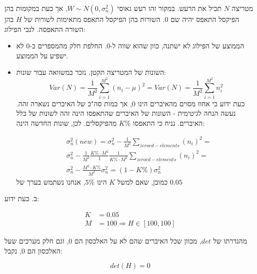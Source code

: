 \documentclass[a4paper]{iacas}
\begin{document}
\begin{hebrew}
מטריצה $N$ תכיל את הרעש. במקור זהו רעש גאוסי $W \sim N(0,\sigma_n^2)$, אך כעת במקומות בהן הפיקסל התאפס יהיה שם 0. השורות בהן הפיקסל התאפס מתאימות לשורות של $H$ בהן השורה התאפסה. לגבי הפילוג:
\begin{itemize}
\item הממוצע של הפילוג לא ישתנה, כוון שהוא שווה ל-$0$. החלפת חלק מהמספרים ב-$0$ לא ישפיע על הממוצע.
\item השונות של המטריצה תקטן. נזכר במשוואה עבור שונות:
\begin{equation*}
Var(N) = \frac{1}{M^2}\sum_{i=1}^{M^2}{(n_i - \mu)^2} = Var(N) = \frac{1}{M^2}\sum_{i=1}^{M^2}{n_i^2} 
\end{equation*}
כעת ידוע כי אחוז מסוים מהאיברים הינו $0$, אך כמות סה"כ של האיברים נשארה זהה. נעשה הנחה לגיטימית - השונות של האיברים שהתאפסו הינה זהה לשונות של כלל האיברים. נניח כי התאפסו $K\%$ מהפיקסלים. לכן, שונות החדשה הינה:

\begin{equation*}
\begin{aligned}
&\sigma_n^2 (new) = \sigma_n^2 -  \frac{1}{M^2}\sum_{zeroed-elements}{(n_i)^2} =\\
&\sigma_n^2 -  \frac{1}{M^2}\frac{K\%\cdot M^2}{1}\frac{1}{K\%\cdot M^2}\sum_{zeroed-elements}{(n_i)^2} =\\
&\sigma_n^2 - \frac{M^2 \cdot K\%}{M^2}\sigma_n^2 = (1-K\%)\sigma^2_n
\end{aligned}
\end{equation*}
כמובן, שאם למשל $K$ הינו $5\%$,  אנחנו נשתמש בערך של $0.05$
\end{itemize}
\end{hebrew}


\newpage
\begin{hebrew}
ב. כעת ידוע:
\end{hebrew}



\begin{align*}
K &= 0.05 \\ 
M &= 100   \Longrightarrow  H \in [100,100]
\end{align*}

\begin{hebrew}

מהגדרתו של $det$, מכוון שכל האיברים שהם לא על האלכסון הם 0, וגם חלק מערכים שעל האלכסון הם 0, נקבל:
\end{hebrew}

\begin{equation*}
det(H) = 0
\end{equation*}
\end{document}
